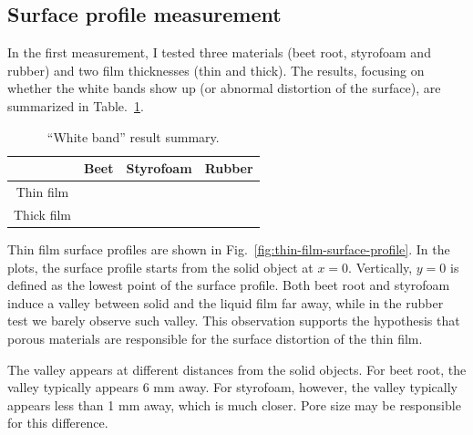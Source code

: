 \documentclass[12pt]{article}
\newcommand{\cmark}{\ding{51}}%
\newcommand{\xmark}{\ding{55}}%
\begin{document}
\subsection{Surface profile measurement}

In the first measurement, I tested three materials (beet root, styrofoam and rubber) and two film thicknesses (thin and thick). 
The results, focusing on whether the white bands show up (or abnormal distortion of the surface), are summarized in Table.~\ref{tab:surface-profile-result}.

\begin{table}
    \centering
    \begin{tabular}{c|ccc}
        \hline
                   & Beet   & Styrofoam & Rubber \\
        \hline 
        Thin film  & \cmark & \cmark    & \xmark \\
        Thick film & \xmark & \xmark    & \xmark \\
        \hline
    \end{tabular}
    \caption{``White band'' result summary.}
    \label{tab:surface-profile-result}
\end{table}

Thin film surface profiles are shown in Fig.~\ref{fig:thin-film-surface-profile}.
In the plots, the surface profile starts from the solid object at $x=0$.
Vertically, $y=0$ is defined as the lowest point of the surface profile.
Both beet root and styrofoam induce a valley between solid and the liquid film far away, while in the rubber test we barely observe such valley.
This observation supports the hypothesis that porous materials are responsible for the surface distortion of the thin film. 

The valley appears at different distances from the solid objects. 
For beet root, the valley typically appears 6 mm away.
For styrofoam, however, the valley typically appears less than 1 mm away, which is much closer. 
Pore size may be responsible for this difference.
\end{document}
